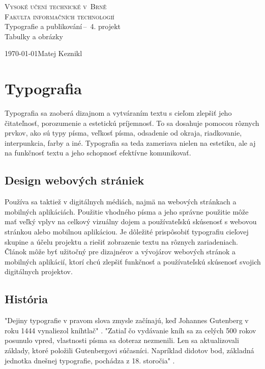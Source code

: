 \documentclass[a4paper, 11pt]{article}
\begin{document}
\begin{titlepage}
	\begin{center} 
		\textsc{\Huge Vysoké učení technické v~Brně\\
			\huge Fakulta informačních technologií \\}
			\LARGE Typografie a publikování\,--\ 4. projekt\\
			\Huge Tabulky a obrázky
			\end{center}
			\Large \today \hfill Matej Keznikl
\end{titlepage}


\section{Typografia}
Typografia sa zaoberá dizajnom a vytváraním textu s cieľom zlepšiť jeho čitateľnosť, porozumenie a estetickú príjemnosť. To sa dosahuje pomocou rôznych prvkov, ako sú typy písma, veľkosť písma, odsadenie od okraja, riadkovanie, interpunkcia, farby a iné. Typografia sa teda zameriava nielen na estetiku, ale aj na funkčnosť textu a jeho schopnosť efektívne komunikovať. \cite{KNUTH}


\subsection{Design webových strániek}
Používa sa taktiež v digitálnych médiách, najmä na webových stránkach a mobilných aplikáciách. Použitie vhodného písma a jeho správne použitie môže mať veľký vplyv na celkový vizuálny dojem a používateľskú skúsenosť s webovou stránkou alebo mobilnou aplikáciou. Je dôležité prispôsobiť typografiu cieľovej skupine a účelu projektu a riešiť zobrazenie textu na rôznych zariadeniach. Článok môže byť užitočný pre dizajnérov a vývojárov webových stránok a mobilných aplikácií, ktorí chcú zlepšiť funkčnosť a používateľskú skúsenosť svojich digitálnych projektov. \cite{WebsiteDesign}

\subsection{História}
"Dejiny typografie v pravom slova zmysle začínajú, keď Johannes Gutenberg v roku 1444 vynaliezol kníhtlač" \cite{Gorecka2012}. "Zatiaľ čo vydávanie kníh sa za celých 500 rokov posunulo vpred, vlastnosti písma sa doteraz nezmenili. Len sa aktualizovali základy, ktoré položili Gutenbergovi súčasníci. Napríklad didotov bod, základná jednotka dnešnej typografie, pochádza z 18. storočia" \cite{Bures2002}.
\end{document}
